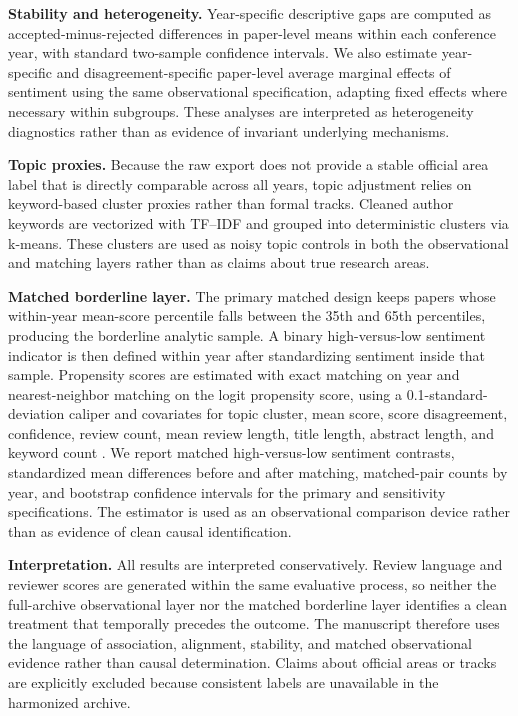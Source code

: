 \documentclass[9pt,twocolumn]{pnas-new}
\begin{document}
{\textbf{Stability and heterogeneity.} Year-specific descriptive gaps are computed as accepted-minus-rejected differences in paper-level means within each conference year, with standard two-sample confidence intervals. We also estimate year-specific and disagreement-specific paper-level average marginal effects of sentiment using the same observational specification, adapting fixed effects where necessary within subgroups. These analyses are interpreted as heterogeneity diagnostics rather than as evidence of invariant underlying mechanisms.\par
\textbf{Topic proxies.} Because the raw export does not provide a stable official area label that is directly comparable across all years, topic adjustment relies on keyword-based cluster proxies rather than formal tracks. Cleaned author keywords are vectorized with TF--IDF and grouped into deterministic clusters via k-means. These clusters are used as noisy topic controls in both the observational and matching layers rather than as claims about true research areas.\par
\textbf{Matched borderline layer.} The primary matched design keeps papers whose within-year mean-score percentile falls between the 35th and 65th percentiles, producing the borderline analytic sample. A binary high-versus-low sentiment indicator is then defined within year after standardizing sentiment inside that sample. Propensity scores are estimated with exact matching on year and nearest-neighbor matching on the logit propensity score, using a 0.1-standard-deviation caliper and covariates for topic cluster, mean score, score disagreement, confidence, review count, mean review length, title length, abstract length, and keyword count \cite{rosenbaum1983central,austin2009balance}. We report matched high-versus-low sentiment contrasts, standardized mean differences before and after matching, matched-pair counts by year, and bootstrap confidence intervals for the primary and sensitivity specifications. The estimator is used as an observational comparison device rather than as evidence of clean causal identification.\par
\textbf{Interpretation.} All results are interpreted conservatively. Review language and reviewer scores are generated within the same evaluative process, so neither the full-archive observational layer nor the matched borderline layer identifies a clean treatment that temporally precedes the outcome. The manuscript therefore uses the language of association, alignment, stability, and matched observational evidence rather than causal determination. Claims about official areas or tracks are explicitly excluded because consistent labels are unavailable in the harmonized archive.%
}
\end{document}
